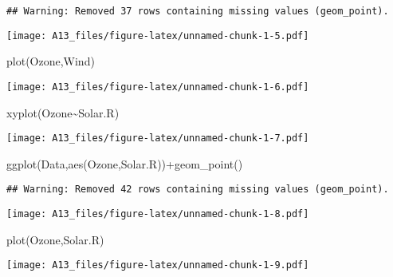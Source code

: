 \documentclass[
]{article}
\newenvironment{Shaded}{\begin{snugshade}}{\end{snugshade}}
\newcommand{\FunctionTok}[1]{\textcolor[rgb]{0.00,0.00,0.00}{#1}}
\newcommand{\NormalTok}[1]{#1}
\newcommand{\SpecialCharTok}[1]{\textcolor[rgb]{0.00,0.00,0.00}{#1}}
\begin{document}
\begin{verbatim}
## Warning: Removed 37 rows containing missing values (geom_point).
\end{verbatim}

\texttt{[image: A13\_files/figure-latex/unnamed-chunk-1-5.pdf]}

\begin{Shaded}
\begin{Highlighting}[]
\FunctionTok{plot}\NormalTok{(Ozone,Wind)}
\end{Highlighting}
\end{Shaded}

\texttt{[image: A13\_files/figure-latex/unnamed-chunk-1-6.pdf]}

\begin{Shaded}
\begin{Highlighting}[]
\FunctionTok{xyplot}\NormalTok{(Ozone}\SpecialCharTok{\textasciitilde{}}\NormalTok{Solar.R)}
\end{Highlighting}
\end{Shaded}

\texttt{[image: A13\_files/figure-latex/unnamed-chunk-1-7.pdf]}

\begin{Shaded}
\begin{Highlighting}[]
\FunctionTok{ggplot}\NormalTok{(Data,}\FunctionTok{aes}\NormalTok{(Ozone,Solar.R))}\SpecialCharTok{+}\FunctionTok{geom\_point}\NormalTok{()}
\end{Highlighting}
\end{Shaded}

\begin{verbatim}
## Warning: Removed 42 rows containing missing values (geom_point).
\end{verbatim}

\texttt{[image: A13\_files/figure-latex/unnamed-chunk-1-8.pdf]}

\begin{Shaded}
\begin{Highlighting}[]
\FunctionTok{plot}\NormalTok{(Ozone,Solar.R)}
\end{Highlighting}
\end{Shaded}

\texttt{[image: A13\_files/figure-latex/unnamed-chunk-1-9.pdf]}
\end{document}
